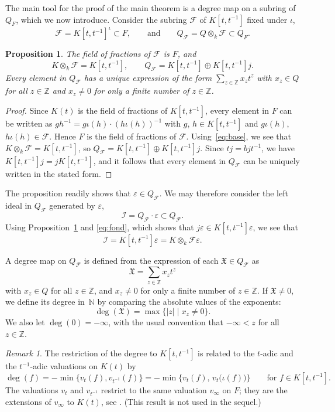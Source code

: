 \documentclass{amsart}
\newcommand{\calQ}{Q_\fq}
\newcommand{\calI}{\mathcal{I}}
\newcommand{\Z}{\mathbb{Z}}
\newcommand{\FQ}{F}
\newcommand{\fq}{\mathcal{F}}
\newtheorem{prop}{Proposition}[section]
\theoremstyle{remark}
\newtheorem*{remk}{Remark}
\begin{document}
The main tool for the proof of the main theorem is a degree map on a
subring of $Q_{\FQ}$, which we now introduce. Consider the subring
$\fq$ of $K[t,t^{-1}]$ fixed under $\iota$,
\[
  \fq=K[t,t^{-1}]^\iota\subset \FQ,
  \qquad\text{and}\qquad
  \calQ=Q\otimes_k\fq\subset Q_\FQ.
\]

\begin{prop}
  \label{prop:defcalQ}
  The field of fractions of $\fq$ is $\FQ$, and
  \[
    K\otimes_k\fq = K[t,t^{-1}],
    \qquad
    \calQ= K[t,t^{-1}]\oplus K[t,t^{-1}]j.
  \]
  Every element in $\calQ$ has a unique expression of the form
  $\sum_{z\in\Z}x_zt^z$ with $x_z\in Q$ for all $z\in \Z$ and
  $x_z\neq0$ for only a finite number of $z\in\Z$.
\end{prop}

\begin{proof}
  Since $K(t)$ is the field of fractions of $K[t,t^{-1}]$,
every element in $\FQ$ can be written as $gh^{-1}=
g\iota(h)\cdot(h\iota(h))^{-1}$ with $g$, $h\in
K[t,t^{-1}]$ and $g\iota(h)$, $h\iota(h)\in\fq$. Hence $\FQ$
is the field of fractions of $\fq$. Using~\eqref{eq:base}, we
see that $K\otimes_k\fq=K[t,t^{-1}]$, so $\calQ=K[t,t^{-1}]\oplus
K[t,t^{-1}]j$. Since $tj=bjt^{-1}$, we have $K[t,t^{-1}]j =
jK[t,t^{-1}]$, and it follows that every element in $\calQ$ can be
uniquely written in the stated form.
\end{proof}

The proposition readily shows that $\varepsilon\in\calQ$. We may
therefore consider the left ideal in $\calQ$ generated by
$\varepsilon$,
\[
  \calI = \calQ\cdot\varepsilon\subset\calQ.
\]
Using Proposition~\ref{prop:defcalQ} and \eqref{eq:fond}, which shows
that $j\varepsilon\in K[t,t^{-1}]\varepsilon$, we see that
\[
  \calI = K[t,t^{-1}]\varepsilon = K\otimes_k\fq\varepsilon.
\]

A degree map on $\calQ$ is defined from the expression of each
$\mathfrak{X}\in \calQ$ as
\[
  \mathfrak{X}= \sum_{z\in\Z}x_zt^z
\]
with $x_z\in Q$ for all $z\in\Z$, and $x_z\neq0$ for only a finite
number of $z\in\Z$. If $\mathfrak{X}\neq0$, we define its degree
in~$\mathbb{N}$  
by comparing the absolute values of the exponents:
\[
  \deg(\mathfrak{X}) = \max\{\lvert z\rvert \mid
  x_z\neq0\}.
\]
We also let $\deg(0)=-\infty$, with the usual convention that
$-\infty<z$ for all $z\in\Z$.

\begin{remk}
  The restriction of the degree to $K[t,t^{-1}]$ is related to the
  $t$-adic and the $t^{-1}$-adic valuations on $K(t)$ by
  \[
    \deg(f) = - \min\{v_t(f),
    v_{t^{-1}}(f)\} = -\min\{v_t(f),\,v_t\bigl(\iota(f)\bigr)\}
    \qquad\text{for $f\in K[t,t^{-1}]$.}
  \]
  The valuations $v_t$ and $v_{t^{-1}}$ restrict to the same valuation
  $v_\infty$ on $\FQ$; they are the extensions of $v_\infty$ to
  $K(t)$, see \cite[Remark~A.8]{MT}. (This result is not used in the
  sequel.) 
\end{remk}
\end{document}
